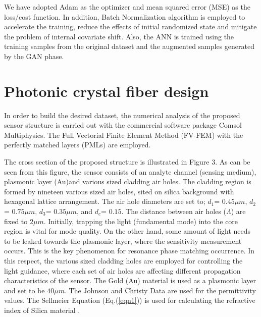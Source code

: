 \documentclass[journal]{IEEEtran}
\begin{document}
We have adopted Adam \cite{kingma2014adam}as the optimizer and mean squared error (MSE) as the loss/cost function. In addition, Batch Normalization algorithm \cite{ioffe2015batch} is employed to accelerate the training, reduce the effects of initial randomized state and mitigate the problem of internal covariate shift. Also, the ANN is trained using the training samples from the original dataset and the augmented samples generated by the GAN phase.

\section{Photonic crystal fiber design}
\label{sec:pcf}

In order to build the desired dataset, the numerical analysis of the proposed sensor structure is carried out with the commercial software package Comsol Multiphysics. The Full Vectorial Finite Element Method (FV-FEM) with the perfectly matched layers (PMLs) \cite{koshiba2002full} are employed.

The cross section of the proposed structure is illustrated in Figure 3. As can be seen from this figure, the sensor consists of an analyte channel (sensing medium), plasmonic layer (Au)and various sized cladding air holes. The cladding region is formed by nineteen various sized air holes, sited on silica background with hexagonal lattice arrangement. The air hole diameters are set to;  $d_1$= $0.45 \mu m$, $d_2$= $0.75 \mu m$, $d_3$= $0.35 \mu m$, and  $d_c$= $0.15$. The distance between air holes ($\Lambda$) are fixed to $2 \mu m$. Initially, trapping the light (fundamental mode) into the core region is vital for mode quality. On the other hand, some amount of light needs to be leaked towards the plasmonic layer, where the sensitivity measurement occurs. This is the key phenomenon for resonance phase matching occurrence. In this respect, the various sized cladding holes are employed for controlling the light guidance, where each set of air holes are affecting different propagation characteristics of the sensor. The Gold (Au) material is used as a plasmonic layer and set to be $40 \mu m$. The Johnson and Christy Data \cite{johnson1972optical} are used for the permittivity values. The Sellmeier Equation (Eq.(\ref{eqn1})) is used for calculating the refractive index of Silica material \cite{bjarklev2003PCF}.
\end{document}
